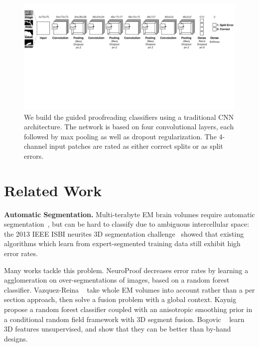 \begin{figure}[t]
\begin{center}
\includegraphics[width=\linewidth]{gfx/architecture.pdf}
\end{center}
  \vspace{-4mm}
   \caption{We build the guided proofreading classifiers using a traditional CNN architecture. The network is based on four convolutional layers, each followed by max pooling as well as dropout regularization. The 4-channel input patches are rated as either correct splits or as split errors.}
\label{fig:architecture}
\end{figure}

\section{Related Work}

\textbf{Automatic Segmentation.} Multi-terabyte EM brain volumes require automatic segmentation~\cite{jain2010,Liu2014,NunezIglesias2013Machine,GALA2014}, but can be hard to classify due to ambiguous intercellular space: the 2013 IEEE ISBI neurites 3D segmentation challenge~\cite{isbi_challenge} showed that existing algorithms which learn from expert-segmented training data still exhibit high error rates. 

Many works tackle this problem. NeuroProof \cite{neuroproof2013} decreases error rates by learning a agglomeration on over-segmentations of images, based on a random forest classifier. Vazquez-Reina \etal~\cite{amelio_segmentation} take whole EM volumes into account rather than a per section approach, then solve a fusion problem with a global context. Kaynig \etal~\cite{kaynig10} propose a random forest classifier coupled with an anisotropic smoothing prior in a conditional random field framework with 3D segment fusion. Bogovic \etal~\cite{BogovicHJ13} learn 3D features unsupervised, and show that they can be better than by-hand designs. 

